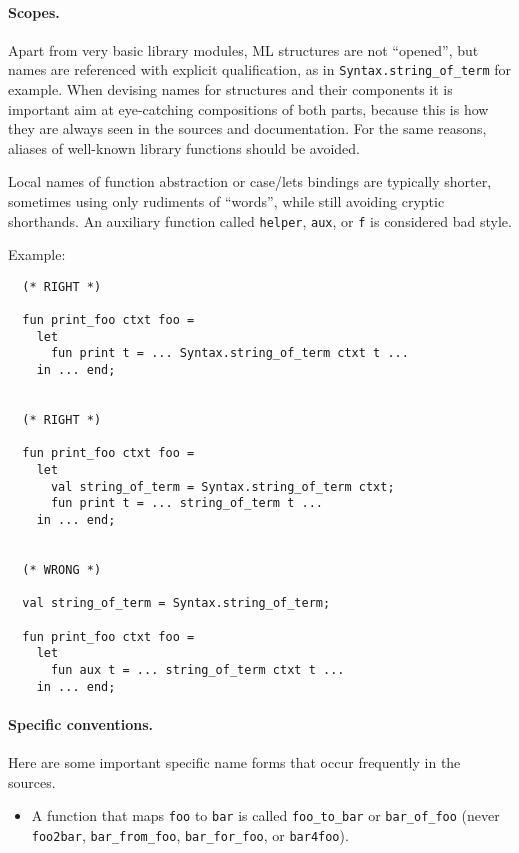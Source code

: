 \begin{isabellebody}
\begin{isamarkuptext}
  \paragraph{Scopes.}  Apart from very basic library modules, ML
  structures are not ``opened'', but names are referenced with
  explicit qualification, as in \verb|Syntax.string_of_term| for
  example.  When devising names for structures and their components it
  is important aim at eye-catching compositions of both parts, because
  this is how they are always seen in the sources and documentation.
  For the same reasons, aliases of well-known library functions should
  be avoided.

  Local names of function abstraction or case/lets bindings are
  typically shorter, sometimes using only rudiments of ``words'',
  while still avoiding cryptic shorthands.  An auxiliary function
  called \verb|helper|, \verb|aux|, or \verb|f| is
  considered bad style.

  Example:

  \begin{verbatim}
  (* RIGHT *)

  fun print_foo ctxt foo =
    let
      fun print t = ... Syntax.string_of_term ctxt t ...
    in ... end;


  (* RIGHT *)

  fun print_foo ctxt foo =
    let
      val string_of_term = Syntax.string_of_term ctxt;
      fun print t = ... string_of_term t ...
    in ... end;


  (* WRONG *)

  val string_of_term = Syntax.string_of_term;

  fun print_foo ctxt foo =
    let
      fun aux t = ... string_of_term ctxt t ...
    in ... end;

  \end{verbatim}


  \paragraph{Specific conventions.} Here are some important specific
  name forms that occur frequently in the sources.

  \begin{itemize}

  \item A function that maps \verb|foo| to \verb|bar| is
  called \verb|foo_to_bar| or \verb|bar_of_foo| (never
  \verb|foo2bar|, \verb|bar_from_foo|, \verb|bar_for_foo|, or \verb|bar4foo|).


\end{itemize}
\end{isamarkuptext}
\end{isabellebody}
